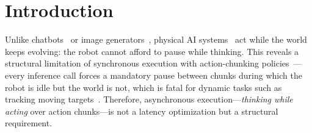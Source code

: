 \documentclass{article}
\begin{document}
\newpage
\section{Introduction}
\label{sec:intro}




Unlike chatbots~\citep{brown2020language, yang2025qwen3} or image generators~\citep{wan2025wan}, physical AI systems~\citep{black2024pi_0, intelligence2025pi_, bjorck2025gr00t, wang2026dadp, openai2018learning, an2025dexterous, su2025hitter, yu2025skillmimic} act while the world keeps evolving: the robot cannot afford to pause while thinking.
This reveals a structural limitation of synchronous execution with action-chunking policies~\citep{chi2025diffusion, lai2025action}---every inference call forces a mandatory pause between chunks during which the robot is idle but the world is not, which is fatal for dynamic tasks such as tracking moving targets~\citep{xie2026dynamicvla}.
Therefore, asynchronous execution---\emph{thinking while acting} over action chunks---is not a latency optimization but a structural requirement.
\end{document}
